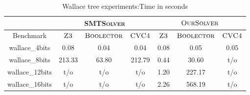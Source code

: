 \begin{table}[]
\centering
\caption{Wallace tree experiments:Time in seconds}
\label{my-label}
\begin{tabular}{|c|c|c|c|c|c|c|}
\hline
                & \multicolumn{3}{c|}{\textsc{SMTSolver}}       & \multicolumn{3}{c|}{$\textsc{OurSolver}$}       \\ \hline
Benchmark       & $\textsc{Z3}$ & $\textsc{Boolector}$ & $\textsc{CVC4}$ & $\textsc{Z3}$ & $\textsc{Boolector}$ & $\textsc{CVC4}$ \\ \hline
wallace\_4bits  & 0.08     & 0.04        & 0.04      & 0.08     & 0.05        & 0.05      \\ \hline
wallace\_8bits  & 213.33  & 63.80      & 212.79   & 0.44     & 30.60       & t/o        \\ \hline
wallace\_12bits & t/o       & t/o          & t/o        & 1.20     & 227.17     & t/o        \\ \hline
wallace\_16bits & t/o       & t/o          & t/o        & 2.26     & 568.19    & t/o        \\ \hline
\end{tabular}
\end{table}


